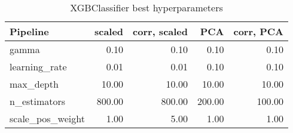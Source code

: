 \begin{table}[!htb]
\centering
\begin{tabular}{lrrrr}
\toprule
Pipeline & scaled & corr, scaled & PCA & corr, PCA \\
\midrule
gamma & 0.10 & 0.10 & 0.10 & 0.10 \\
learning\_rate & 0.01 & 0.01 & 0.10 & 0.10 \\
max\_depth & 10.00 & 10.00 & 10.00 & 10.00 \\
n\_estimators & 800.00 & 800.00 & 200.00 & 100.00 \\
scale\_pos\_weight & 1.00 & 5.00 & 1.00 & 1.00 \\
\bottomrule
\end{tabular}
\caption{XGBClassifier best hyperparameters}
\label{table-xgbclassifier-params}
\end{table}
